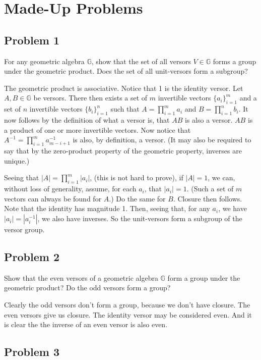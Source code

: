 \documentclass[12pt]{article}
\newcommand{\G}{\mathbb{G}}
\begin{document}
\section*{Made-Up Problems}

\subsection*{Problem 1}

For any geometric algebra $\G$, show that
the set of all versors $V\in\G$ forms a group under the geometric product.
Does the set of all unit-versors form a subgroup?

The geometric product is associative.
Notice that 1 is the identity versor.  Let $A,B\in\G$ be versors.
There then exists a set of $m$ invertible vectors $\{a_i\}_{i=1}^m$ and
a set of $n$ invertible vectors $\{b_i\}_{i=1}^n$ such that
$A=\prod_{i=1}^m a_i$ and $B=\prod_{i=1}^n b_i$.
It now follows by the definition of what a versor is, that $AB$ is also a versor.
$AB$ is a product of one or more invertible vectors.
Now notice that $A^{-1}=\prod_{i=1}^m a_{m-i+1}^{-1}$ is also, by
definition, a versor.  (It may also be required to say that by the zero-product
property of the geometric property, inverses are unique.)

Seeing that $|A|=\prod_{i=1}^m |a_i|$, (this is not hard to prove), if $|A|=1$, we can, without loss
of generality, assume, for each $a_i$, that $|a_i|=1$.  (Such a set of $m$
vectors can always be found for $A$.)  Do the same for $B$.  Closure then follows.  Note that the identity
has magnitude 1.  Then, seeing that, for any $a_i$, we have $|a_i|=|a_i^{-1}|$,
we also have inverses.  So the unit-versors form a subgroup of the versor group.

\subsection*{Problem 2}

Show that the even versors of a geometric algebra $\G$
form a group under the geometric product?  Do the odd versors form a group?

Clearly the odd versors don't form a group, because we don't have closure.
The even versors give us closure.  The identity versor may be considered even.
And it is clear the the inverse of an even versor is also even.

\subsection*{Problem 3}
\end{document}
